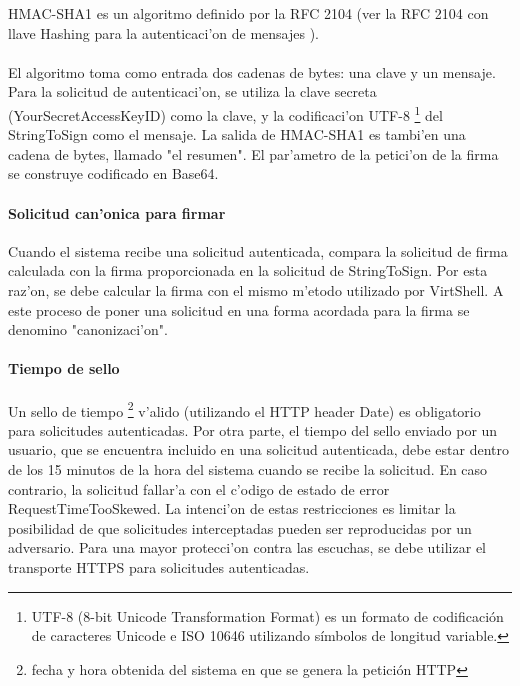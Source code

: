 \vspace{5mm}

HMAC-SHA1 es un algoritmo definido por la RFC 2104 (ver la RFC 2104 con llave Hashing para la autenticaci'on de mensajes \cite{rfc2104}).\\
\\
El algoritmo toma como entrada dos cadenas de bytes: una clave y un mensaje. Para la solicitud de autenticaci'on, se utiliza la clave secreta (YourSecretAccessKeyID) como la clave, y la codificaci'on UTF-8 \footnote{UTF-8 (8-bit Unicode Transformation Format) es un formato de codificación de caracteres Unicode e ISO 10646 utilizando símbolos de longitud variable.} del StringToSign como el mensaje. La salida de HMAC-SHA1 es tambi'en una cadena de bytes, llamado "el resumen". El par'ametro de la petici'on de la firma se construye codificado en Base64.

\paragraph{Solicitud can'onica para firmar}

Cuando el sistema recibe una solicitud autenticada, compara la solicitud de firma calculada con la firma proporcionada en la solicitud de StringToSign. Por esta raz'on, se debe calcular la firma con el mismo m'etodo utilizado por VirtShell. A este proceso de poner una solicitud en una forma acordada para la firma se denomino "canonizaci'on".

\paragraph{Tiempo de sello}

Un sello de tiempo \footnote{fecha y hora obtenida del sistema en que se genera la petición HTTP} v'alido (utilizando el HTTP header Date) es obligatorio para solicitudes autenticadas. Por otra parte, el tiempo del sello enviado por un usuario, que se encuentra incluido en una solicitud autenticada, debe estar dentro de los 15 minutos de la hora del sistema cuando se recibe la solicitud. En caso contrario, la solicitud fallar'a con el c'odigo de estado de error RequestTimeTooSkewed. La intenci'on de estas restricciones es limitar la posibilidad de que solicitudes interceptadas pueden ser reproducidas por un adversario. Para una mayor protecci'on contra las escuchas, se debe utilizar el transporte HTTPS para solicitudes autenticadas.



